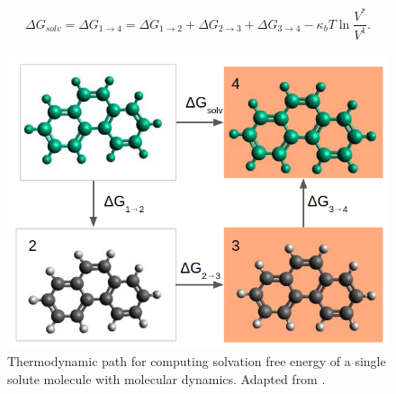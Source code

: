 \begin{equation}
\label{eq:freesolv}
\begin{aligned}
\Delta G_{solv} = \Delta G_{1 \rightarrow 4} = \Delta G_{1 \rightarrow 2} + \Delta G_{2 \rightarrow 3} + \Delta G_{3 \rightarrow 4}  - \kappa_{b}T \ln \dfrac{V^{*}}{V^{1}} .
\end{aligned}
\end{equation}

\begin{figure}[th]
	\centering
	\includegraphics[scale=0.6]{Figures/cicclotermo}
	\caption{Thermodynamic path for computing solvation free energy of a single solute molecule with molecular dynamics. Adapted from .}
	\label{thermcy}
\end{figure}

